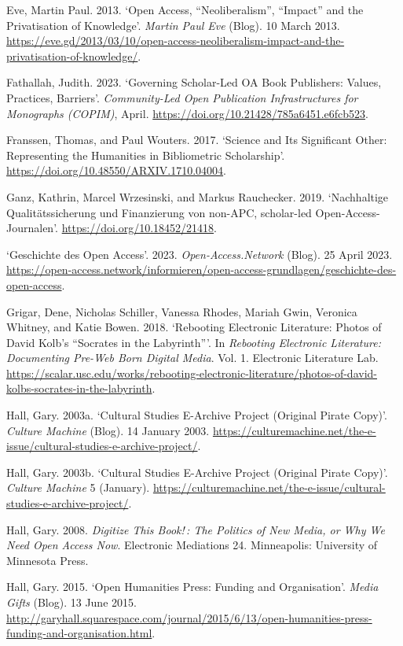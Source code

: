 \documentclass[a4paper,
fontsize=11pt,
oneside,
numbers=noperiodatend,
parskip=half-,
bibliography=totoc,
final
]{scrartcl}
\begin{document}
Eve, Martin Paul. 2013. \enquote*{Open Access, \enquote{Neoliberalism}, \enquote{Impact} and the Privatisation of Knowledge}. \emph{Martin Paul Eve} (Blog). 10 March 2013. \url{https://eve.gd/2013/03/10/open-access-neoliberalism-impact-and-the-privatisation-of-knowledge/}.

Fathallah, Judith. 2023. \enquote*{Governing Scholar-Led OA Book
Publishers: Values, Practices, Barriers}. \emph{Community-Led Open
Publication Infrastructures for Monographs (COPIM)}, April.
\url{https://doi.org/10.21428/785a6451.e6fcb523}.

Franssen, Thomas, and Paul Wouters. 2017. \enquote*{Science and Its
Significant Other: Representing the Humanities in Bibliometric
Scholarship}. \url{https://doi.org/10.48550/ARXIV.1710.04004}.

Ganz, Kathrin, Marcel Wrzesinski, and Markus Rauchecker. 2019.
\enquote*{Nachhaltige Qualitätssicherung und Finanzierung von non-APC,
scholar-led Open-Access-Journalen}.
\url{https://doi.org/10.18452/21418}.

\enquote*{Geschichte des Open Access}. 2023. \emph{Open-Access.Network}
(Blog). 25 April 2023.
\url{https://open-access.network/informieren/open-access-grundlagen/geschichte-des-open-access}.

Grigar, Dene, Nicholas Schiller, Vanessa Rhodes, Mariah Gwin, Veronica
Whitney, and Katie Bowen. 2018. \enquote*{Rebooting Electronic Literature: Photos of David Kolb's \enquote{Socrates in the Labyrinth}}.
In \emph{Rebooting Electronic Literature: Documenting Pre-Web Born
Digital Media}. Vol. 1. Electronic Literature Lab.
\url{https://scalar.usc.edu/works/rebooting-electronic-literature/photos-of-david-kolbs-socrates-in-the-labyrinth}.

Hall, Gary. 2003a. \enquote*{Cultural Studies E-Archive Project
(Original Pirate Copy)}. \emph{Culture Machine} (Blog). 14 January 2003.
\url{https://culturemachine.net/the-e-issue/cultural-studies-e-archive-project/}.

Hall, Gary. 2003b. \enquote*{Cultural Studies E-Archive Project
(Original Pirate Copy)}. \emph{Culture Machine} 5 (January).
\url{https://culturemachine.net/the-e-issue/cultural-studies-e-archive-project/}.

Hall, Gary. 2008. \emph{Digitize This Book!\,: The Politics of New
Media, or Why We Need Open Access Now}. Electronic Mediations 24.
Minneapolis: University of Minnesota Press.

Hall, Gary. 2015. \enquote*{Open Humanities Press: Funding and
Organisation}. \emph{Media Gifts} (Blog). 13 June 2015.
\url{http://garyhall.squarespace.com/journal/2015/6/13/open-humanities-press-funding-and-organisation.html}.
\end{document}
